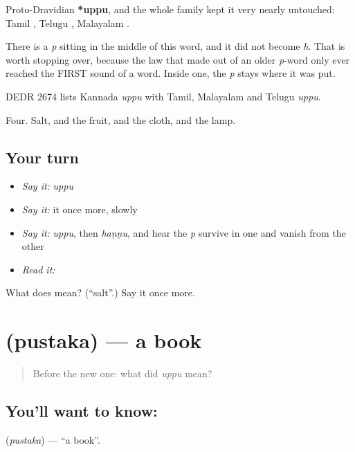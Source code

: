 Proto-Dravidian \textbf{*uppu}, and the whole family kept it very nearly untouched: Tamil , Telugu , Malayalam .

There is a \emph{p} sitting in the middle of this word, and it did not become \emph{h}. That is worth stopping over, because the law that made  out of an older \emph{p}-word only ever reached the FIRST sound of a word. Inside one, the \emph{p} stays where it was put.

DEDR 2674 lists Kannada \emph{uppu} with Tamil, Malayalam and Telugu \emph{uppu}.

\begin{grammarlens}[title={What you've built}]
Four. Salt, and the fruit, and the cloth, and the lamp.
\end{grammarlens}

\subsection*{Your turn}
\begin{itemize}
\raggedright
  \item \emph{Say it:} \emph{uppu}
  \item \emph{Say it:} it once more, slowly
  \item \emph{Say it:} \emph{uppu}, then \emph{haṇṇu}, and hear the \emph{p} survive in one and vanish from the other
  \item \emph{Read it:} \textbf{}
\end{itemize}

\begin{tcolorbox}[breakable,colback=teal!4,colframe=teal!35!black,title={Before you move on}]
What does  mean? (\textquotedblleft{}salt\textquotedblright{}.) Say it once more.
\end{tcolorbox}
\section[\texorpdfstring{\kn{ಪುಸ್ತಕ} (pustaka)}{ಪುಸ್ತಕ (pustaka)}]{ (pustaka) — a book}

\label{lesson:KA-C46-book}



\begin{quote}
Before the new one: what did \emph{uppu} mean?
\end{quote}

\subsection*{You'll want to know: }
\textbf{} (\emph{pustaka}) — \textquotedblleft{}a book\textquotedblright{}.

